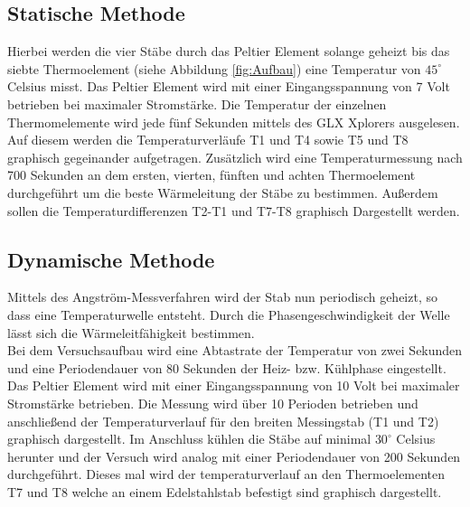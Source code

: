 \subsection{Statische Methode}
Hierbei werden die vier Stäbe durch das Peltier Element solange geheizt bis das siebte Thermoelement (siehe Abbildung \ref{fig:Aufbau}) eine Temperatur von $45^\circ$ Celsius misst. Das Peltier Element wird mit einer Eingangsspannung von 7 Volt betrieben bei maximaler Stromstärke. Die Temperatur der einzelnen Thermomelemente wird jede fünf Sekunden mittels des GLX Xplorers ausgelesen. Auf diesem werden die Temperaturverläufe T1 und T4 sowie T5 und T8 graphisch gegeinander aufgetragen. Zusätzlich wird eine Temperaturmessung nach 700 Sekunden an dem ersten, vierten, fünften und achten Thermoelement durchgeführt um die beste Wärmeleitung der Stäbe zu bestimmen. Außerdem sollen die Temperaturdifferenzen T2-T1 und T7-T8 graphisch Dargestellt werden.

\subsection{Dynamische Methode}
Mittels des Angström-Messverfahren wird der Stab nun periodisch geheizt, so dass eine Temperaturwelle entsteht. Durch die Phasengeschwindigkeit der Welle lässt sich die Wärmeleitfähigkeit bestimmen. \ \\
Bei dem Versuchsaufbau wird eine Abtastrate der Temperatur von zwei Sekunden und eine Periodendauer von 80 Sekunden der Heiz- bzw. Kühlphase eingestellt. Das Peltier Element wird mit einer Eingangsspannung von 10 Volt bei maximaler Stromstärke betrieben. Die Messung wird über 10 Perioden betrieben und anschließend der Temperaturverlauf für den breiten Messingstab (T1 und T2) graphisch dargestellt.
Im Anschluss kühlen die Stäbe auf minimal $30^\circ$ Celsius herunter und der Versuch wird analog mit einer Periodendauer von 200 Sekunden durchgeführt. Dieses mal wird der temperaturverlauf an den Thermoelementen T7 und T8 welche an einem Edelstahlstab befestigt sind graphisch dargestellt.
